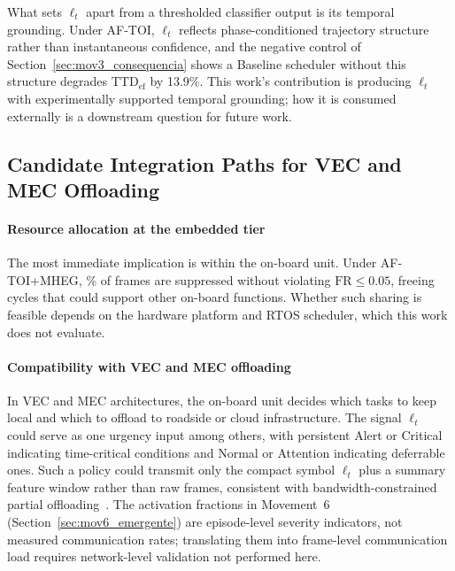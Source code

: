 \documentclass[a4paper,fleqn]{cas-dc}
\newcommand{\AFTOI}{\mbox{AF-TOI}\xspace}
\begin{document}
What sets $\ell_t$ apart from a thresholded classifier output is its temporal
grounding. Under \AFTOI, $\ell_t$ reflects phase-conditioned trajectory
structure rather than instantaneous confidence, and the negative control of
Section~\ref{sec:mov3_consequencia} shows a Baseline scheduler without this
structure degrades $\mathrm{TTD}_{\mathrm{ef}}$ by {\color{\revcolor}13.9\%}. This work's
contribution is producing $\ell_t$ with experimentally supported temporal
grounding; how it is consumed externally is a downstream question for future
work.
\subsection{Candidate Integration Paths for VEC and MEC Offloading}
\label{sec:vecmec_implications}
\paragraph{Resource allocation at the embedded tier}
The most immediate implication is within the on-board unit. Under \mbox{AF-TOI}+MHEG,
{\color{\revcolor}\SkipRate\%} of frames are suppressed without violating $\mathrm{FR} \le 0.05$,
freeing cycles that could support other on-board functions. Whether such sharing
is feasible depends on the hardware platform and RTOS scheduler, which this work
does not evaluate.
\paragraph{Compatibility with VEC and MEC offloading}
In VEC and MEC architectures, the on-board unit decides which tasks to keep
local and which to offload to roadside or cloud infrastructure. The signal
$\ell_t$ could serve as one urgency input among others, with persistent Alert or
Critical indicating time-critical conditions and Normal or Attention indicating
deferrable ones. Such a policy could transmit only the compact symbol $\ell_t$
plus a summary feature window rather than raw frames, consistent with
bandwidth-constrained partial offloading~\cite{uddin2025taskoffloading}. The
activation fractions in Movement~6 (Section~\ref{sec:mov6_emergente}) are
episode-level severity indicators, not measured communication rates; translating
them into frame-level communication load requires network-level validation not
performed here.
\end{document}
